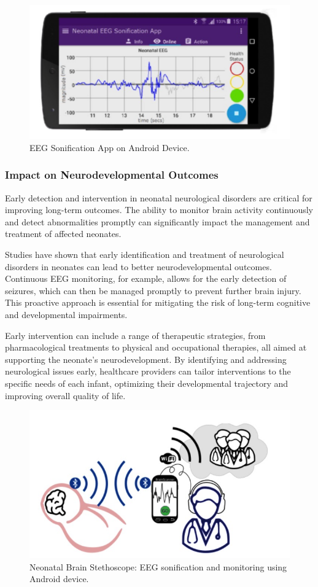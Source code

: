 \documentclass[12pt,journal,compsoc]{IEEEtran}
\begin{document}
\begin{figure}[H]
    \centering
    \includegraphics[width=0.6\linewidth]{andorid_app_demo.png}
    \caption{EEG Sonification App on Android Device.}
    \label{fig:app_demo}
\end{figure}

\subsubsection{Impact on Neurodevelopmental Outcomes}

Early detection and intervention in neonatal neurological disorders are critical for improving long-term outcomes. The ability to monitor brain activity continuously and detect abnormalities promptly can significantly impact the management and treatment of affected neonates.

Studies have shown that early identification and treatment of neurological disorders in neonates can lead to better neurodevelopmental outcomes. Continuous EEG monitoring, for example, allows for the early detection of seizures, which can then be managed promptly to prevent further brain injury. This proactive approach is essential for mitigating the risk of long-term cognitive and developmental impairments.

Early intervention can include a range of therapeutic strategies, from pharmacological treatments to physical and occupational therapies, all aimed at supporting the neonate's neurodevelopment. By identifying and addressing neurological issues early, healthcare providers can tailor interventions to the specific needs of each infant, optimizing their developmental trajectory and improving overall quality of life.

\begin{figure}[H]
    \centering
    \includegraphics[width=0.6\linewidth]{neonatal_brain_stethoscope.png}
    \caption{Neonatal Brain Stethoscope: EEG sonification and monitoring using Android device.}
    \label{fig:brain_stethoscope}
\end{figure}
\end{document}
